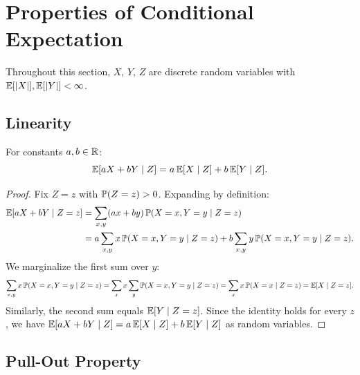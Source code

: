 \documentclass[11pt,a4paper]{article}
\begin{document}

\section{Properties of Conditional Expectation}
\label{sec:properties}

Throughout this section, $X$, $Y$, $Z$ are discrete random
variables with $\mathbb{E}[|X|], \mathbb{E}[|Y|] < \infty$.

\subsection{Linearity}
\label{subsec:linearity}

\begin{theorem}
\label{thm:cond_linearity}
For constants $a, b \in \mathbb{R}$:
\begin{equation}
  \mathbb{E}[aX + bY \mid Z] = a\,\mathbb{E}[X \mid Z] + b\,\mathbb{E}[Y \mid Z].
  \label{eq:cond_linearity}
\end{equation}
\end{theorem}

\begin{proof}
Fix $Z = z$ with $\mathbb{P}(Z = z) > 0$.  Expanding by definition:
\begin{align}
  \mathbb{E}[aX + bY \mid Z = z]
  &= \sum_{x,y} (ax + by)\, \mathbb{P}(X = x, Y = y \mid Z = z)
  \nonumber\\
  &= a \sum_{x,y} x\, \mathbb{P}(X = x, Y = y \mid Z = z)
    + b \sum_{x,y} y\, \mathbb{P}(X = x, Y = y \mid Z = z).
  \label{eq:lin_step1}
\end{align}
We marginalize the first sum over $y$:
\begin{equation}
  \sum_{x,y} x\, \mathbb{P}(X = x, Y = y \mid Z = z)
  = \sum_x x \sum_y \mathbb{P}(X = x, Y = y \mid Z = z)
  = \sum_x x\, \mathbb{P}(X = x \mid Z = z)
  = \mathbb{E}[X \mid Z = z].
  \label{eq:lin_marginalize}
\end{equation}
Similarly, the second sum equals $\mathbb{E}[Y \mid Z = z]$.  Since the
identity holds for every $z$, we have
$\mathbb{E}[aX + bY \mid Z] = a\,\mathbb{E}[X \mid Z] + b\,\mathbb{E}[Y \mid Z]$ as
random variables.
\end{proof}

\subsection{Pull-Out Property}
\label{subsec:pullout}
\end{document}
